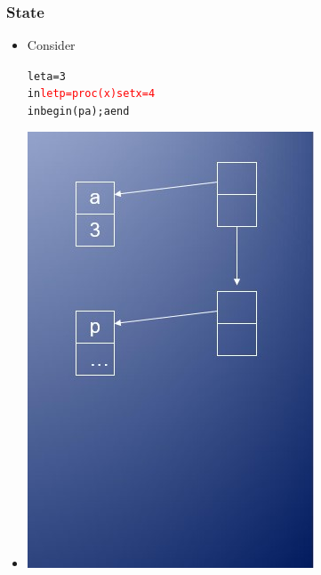 \documentclass{beamer}
\begin{document}
\begin{frame}[fragile]
\frametitle{State}
\begin{scriptsize}
\begin{itemize}
\item<1-> Consider
\begin{alltt}
let a = 3
in \textcolor{red}{let p = proc (x) set x = 4}
   in begin (p a); a end
\end{alltt}

\item<1->
\begin{center}
\includegraphics[scale=0.5]{cbv2.jpg}
\end{center}

\end{itemize}
\end{scriptsize}
\end{frame}
\end{document}
